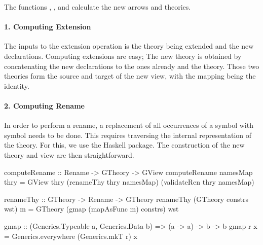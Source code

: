 The functions , , and  calculate the new arrows and theories. 

\paragraph{1. Computing Extension}
The inputs to the extension operation is the theory being extended and the new declarations. Computing extensions are easy; The new theory is obtained by concatenating the new declarations to the ones already and the theory. Those two theories form the source and target of the new view, with the mapping being the identity. 

\paragraph{2. Computing Rename}
In order to perform a rename, a replacement of all occurrences of a symbol  with symbol  needs to be done. This requires traversing the internal representation of the theory. For this, we use the Haskell  package. The construction of the new theory and view are then straightforward.   
\begin{hscode}
computeRename :: Rename -> GTheory -> GView  
computeRename namesMap thry =
  GView thry (renameThy thry namesMap) (validateRen thry namesMap)

renameThy :: GTheory -> Rename -> GTheory
renameThy (GTheory constrs wst) m =
  GTheory (gmap (mapAsFunc m) constrs) wst
  
gmap :: (Generics.Typeable a, Generics.Data b) => (a -> a) -> b -> b
gmap r x = Generics.everywhere (Generics.mkT r) x  
\end{hscode}

